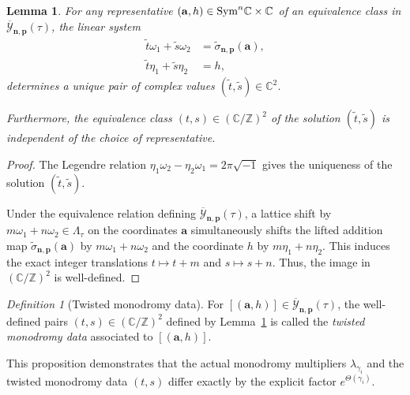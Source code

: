 \documentclass[11pt]{amsart}
\newtheorem{lemma}[theorem]{Lemma}
\theoremstyle{remark}
\newtheorem{definition}[theorem]{Definition}
\numberwithin{equation}{section}
\newcommand{\Sym}{{\rm Sym}}
\begin{document}
\begin{lemma} \label{l:twisted_mono_data}
For any representative $(\mathbf{a}, h) \in \Sym^n \mathbb{C} \times \mathbb{C}$ of an equivalence class in $\overline{\mathcal{Y}}_{\mathbf{n},\mathbf{p}}(\tau)$, the linear system
\begin{equation}
\begin{split}
    \tilde{t} \omega_1 + \tilde{s} \omega_2 &= \widetilde{\sigma}_{\mathbf{n},\mathbf{p}}(\mathbf{a}), \\
    \tilde{t} \eta_1 + \tilde{s} \eta_2 &= h,
\end{split}
\end{equation}
determines a unique pair of complex values $(\tilde{t},\tilde{s})\in \mathbb{C}^2$.

Furthermore, the equivalence class $(t,s) \in (\mathbb{C}/\mathbb{Z})^2$ of the solution $(\tilde{t},\tilde{s})$ is independent of the choice of representative. 
\end{lemma}
\begin{proof}
The Legendre relation $\eta_1 \omega_2 - \eta_2 \omega_1 = 2\pi \sqrt{-1}$ gives the uniqueness of the solution $(\tilde{t}, \tilde{s})$. 

Under the equivalence relation defining $\overline{\mathcal{Y}}_{\mathbf{n},\mathbf{p}}(\tau)$, a lattice shift by $m\omega_1 + n\omega_2 \in \Lambda_\tau$ on the coordinates $\mathbf{a}$ simultaneously shifts the lifted addition map $\widetilde{\sigma}_{\mathbf{n},\mathbf{p}}(\mathbf{a})$ by $m\omega_1 + n\omega_2$ and the coordinate $h$ by $m\eta_1 + n\eta_2$. This induces the exact integer translations $t \mapsto t+m$ and $s \mapsto s+n$. Thus, the image in $(\mathbb{C}/\mathbb{Z})^2$ is well-defined.
\end{proof}

\begin{definition}[Twisted monodromy data]
For $[(\mathbf{a},h)] \in \overline{\mathcal{Y}}_{\mathbf{n},\mathbf{p}}(\tau)$, the well-defined pairs $(t,s)\in (\mathbb{C}/\mathbb{Z})^2$ defined by Lemma~\ref{l:twisted_mono_data} is called the \emph{twisted monodromy data} associated to $[(\mathbf{a},h)]$.
\end{definition}

This proposition demonstrates that the actual monodromy multipliers $\lambda_{\gamma_i}$ and the twisted monodromy data $(t,s)$ differ exactly by the explicit factor $e^{\Theta(\gamma_i)}$.
\end{document}

